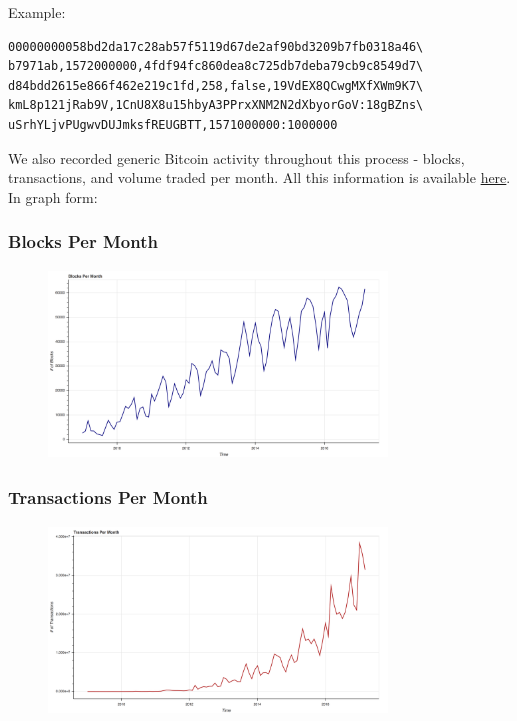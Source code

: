 \documentclass[9pt,twocolumn,twoside]{idsi}
\begin{document}
Example:
\begin{lstlisting}
00000000058bd2da17c28ab57f5119d67de2af90bd3209b7fb0318a46\
b7971ab,1572000000,4fdf94fc860dea8c725db7deba79cb9c8549d7\
d84bdd2615e866f462e219c1fd,258,false,19VdEX8QCwgMXfXWm9K7\
kmL8p121jRab9V,1CnU8X8u15hbyA3PPrxXNM2N2dXbyorGoV:18gBZns\
uSrhYLjvPUgwvDUJmksfREUGBTT,1571000000:1000000
\end{lstlisting}

We also recorded generic Bitcoin activity throughout this process - blocks, transactions, and volume traded per month. All this information is available \href{https://github.com/nishilshah17/idsi_bitcoin/blob/44ec93f337bdf620b56f4343650f2a572aca2cb4/data/output/general/monthly_activity.txt}{here}. In graph form:

\subsubsection{Blocks Per Month}
\begin{figure}[!ht]
\includegraphics[width=9cm, height=5cm]{data/output/general/monthly_block_activity.png}
\end{figure}

\subsubsection{Transactions Per Month}
\begin{figure}[!ht]
\includegraphics[width=9cm, height=5cm]{data/output/general/monthly_transaction_activity.png}
\end{figure}
\end{document}
